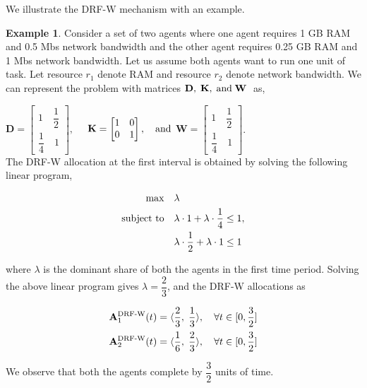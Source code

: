 \documentclass[letterpaper]{article} %
\theoremstyle{definition}
\newtheorem{example}{Example}
\begin{document}
We illustrate the DRF-W mechanism with an example. 
\begin{example}
Consider a set of two agents where one agent requires 1 GB RAM and 0.5 Mbs network bandwidth and the other agent requires 0.25 GB RAM and 1 Mbs network bandwidth. Let us assume both agents want to run one unit of task. Let resource $r_{1}$ denote RAM and resource $r_{2}$ denote network bandwidth. We can represent the problem with matrices $\mathbf{D}, \; \mathbf{K}, \; \textnormal{and} \; \mathbf{W}\;$ as, 

\noindent $\mathbf{D} = \begin{bmatrix} 1 \quad \dfrac{1}{2} \\\dfrac{1}{4} \quad 1 \end{bmatrix}, \quad$
$\mathbf{K} = \begin{bmatrix} 1 \quad 0 \\0 \quad 1 \end{bmatrix}, \quad \textnormal{and}$
$\mathbf{W} = \begin{bmatrix} 1 \quad \dfrac{1}{2} \\\dfrac{1}{4} \quad 1 \end{bmatrix}$.\\[4 pt]
The DRF-W allocation at the first interval is obtained by solving the following linear program,
\begin{linenomath}
\begin{align*} 
\begin{split}
\max \quad & \lambda  
\\ \textnormal{subject to} \quad  & \lambda \cdot 1 + \lambda \cdot \dfrac{1}{4} \leq 1, \\ &  \lambda \cdot \dfrac{1}{2} + \lambda \cdot 1 \leq 1    
\end{split}
\end{align*}
\end{linenomath}

\noindent where $\lambda$ is the dominant share of both the agents in the first time period. Solving the above linear program gives $\lambda = \displaystyle  \dfrac{2}{3}$, and the DRF-W allocations as
\begin{linenomath}
\begin{align*} 
\begin{split}
\mathbf{A}^{\textnormal{DRF-W}}_{1}(t) & = \langle \dfrac{2}{3}, \; \dfrac{1}{3}\rangle, \quad \forall t \in [0, \dfrac{3}{2}] \\[1 pt]
\mathbf{A}^{\textnormal{DRF-W}}_{2}(t) & = \langle \dfrac{1}{6}, \; \dfrac{2}{3} \rangle, \quad \forall t \in [0, \dfrac{3}{2}]  
\end{split}
\end{align*}
\end{linenomath}

\noindent We observe that both the agents complete by $\displaystyle \dfrac{3}{2}$ units of time.
\end{example}
\end{document}
